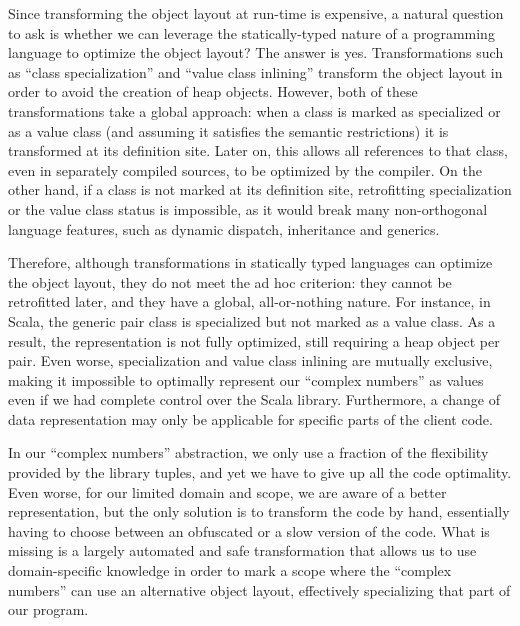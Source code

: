 
Since transforming the object layout at run-time is expensive, a
natural question to ask is whether we can leverage the
statically-typed nature of a programming language to optimize the
object layout? The answer is yes. Transformations such as ``class
specialization'' and ``value class inlining'' transform the object
layout in order to avoid the creation of heap objects. However, both
of these transformations take a global approach: when a class is
marked as specialized or as a value class (and assuming it satisfies the
semantic restrictions) it is transformed at its definition site. Later
on, this allows all references to that class, even in separately
compiled sources, to be optimized by the compiler. On the other hand,
if a class is not marked at its definition site, retrofitting
specialization or the value class status is impossible, as it would
break many non-orthogonal language features, such as dynamic dispatch,
inheritance and generics.

Therefore, although transformations in statically typed languages can
optimize the object layout, they do not meet the ad hoc criterion:
they cannot be retrofitted later, and they have a global, all-or-nothing
nature. For instance, in Scala, the generic pair class is specialized
but not marked as a value class. As a result, the representation is
not fully optimized, still requiring a heap object per pair. Even
worse, specialization and value class inlining are mutually exclusive,
making it impossible to optimally represent our ``complex numbers''
as values even if we had complete control over the Scala library.
Furthermore, a change of data representation may only be applicable for
specific parts of the client code.

In our ``complex numbers'' abstraction, we only
use a fraction of the flexibility provided by the library tuples, and
yet we have to give up all the code optimality. Even worse, for our
limited domain and scope, we are aware of a better representation, but
the only solution is to transform the code by hand, essentially having
to choose between an obfuscated or a slow version of the code. What is
missing is a largely automated and safe transformation that allows us
to use domain-specific knowledge in order to mark a scope where the
``complex numbers'' can use an alternative object layout, effectively
specializing that part of our program.

